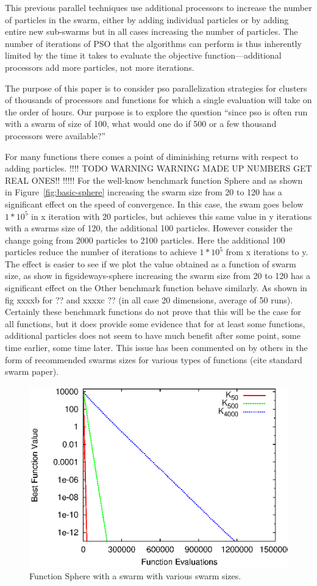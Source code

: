 \documentclass[journal,letterpaper]{IEEEtran}
\newcommand{\fig}[1]{Figure~\ref{fig:#1}}
\begin{document}
This previous parallel techniques use additional processors to increase the
number of particles in the swarm, either by adding individual particles or by
adding entire new sub-swarms but in all cases increasing the number of particles.  The number of iterations of PSO that the
algorithms can perform is thus inherently limited by the time it takes to
evaluate the objective function---additional processors add more particles, not
more iterations.

The purpose of this paper is to consider pso parallelization strategies for
clusters of thousands of processors and functions for which a single
evaluation will take on the order of hours.
Our purpose is to explore the question ``since pso is often run with
a swarm of size of 100, what would one do if 500 or a few thousand processors were available?''

For many functions there comes a point of diminishing returns with respect to adding particles.
!!!! TODO WARNING WARNING MADE UP NUMBERS GET REAL ONES!! !!!!!
For the well-know benchmark function Sphere and as shown in \fig{basic-sphere} increasing the swarm size from 20 to 120 has a significant effect on the 
speed of convergence. In this case, the swam goes below $1*10^5$ in x iteration with 20 particles, but 
achieves this same value in  y iterations with a swarms size of 120, the additional 100 particles.
However consider the change going from 2000 particles to 2100 particles. Here the additional 100 particles
reduce the number of iterations to achieve $1*10^5$ from x iterations to y.
The effect is easier to see if we plot the value obtained as a function of swarm size, as show in 
fig{sideways-sphere} increasing the swarm size from 20 to 120 has a significant effect on the 
Other benchmark function behave similarly. As shown in fig xxxxb for ?? and xxxxc ?? (in all case 20 dimensions, average of 50 runs).
Certainly these benchmark functions do not prove that this will be the case for all functions,
but it does provide some evidence that for at least some functions,
additional particles does not seem to have much benefit after some point,
some time earlier, some time later. This issue has been commented on by others
in the form of recommended swarms sizes for various types of functions (cite standard swarm paper).

\begin{figure}
  \centering
  \includegraphics[width=.8\columnwidth]{evals_sphere.eps}
  \caption{Function Sphere with a swarm with various swarm sizes.}
  \label{fig:evals-sphere}
\end{figure}
\end{document}
